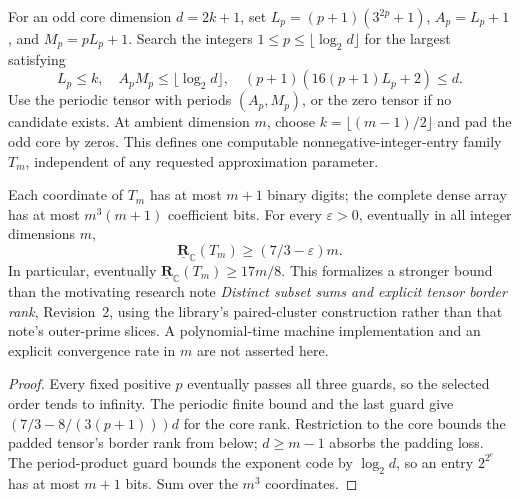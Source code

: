 \begin{definition}
  \label{def:frontiers-dissociated-uniform-tensor}
  \leanok
  For an odd core dimension $d=2k+1$, set $L_p=(p+1)(3^{2p}+1)$,
  $A_p=L_p+1$, and $M_p=pL_p+1$. Search the integers
  $1\le p\le\lfloor\log_2d\rfloor$ for the largest satisfying
  \[
    L_p\le k,\quad A_pM_p\le\lfloor\log_2d\rfloor,\quad
    (p+1)(16(p+1)L_p+2)\le d.
  \]
  Use the periodic tensor with periods $(A_p,M_p)$, or the zero tensor if
  no candidate exists. At ambient dimension $m$, choose
  $k=\lfloor(m-1)/2\rfloor$ and pad the odd core by zeros. This defines one
  computable nonnegative-integer-entry family $T_m$, independent of any
  requested approximation parameter.
\end{definition}

\begin{theorem}
  \label{thm:frontiers-dissociated-uniform-border-rank}
  \leanok
  Each coordinate of $T_m$ has at most $m+1$ binary digits; the complete dense
  array has at most $m^3(m+1)$ coefficient bits. For every $\varepsilon>0$,
  eventually in all integer dimensions $m$,
  \[
    \underline{\mathbf R}_{\mathbb C}(T_m)\ge(7/3-\varepsilon)m.
  \]
  In particular, eventually $\underline{\mathbf R}_{\mathbb C}(T_m)\ge17m/8$.
  This formalizes a stronger bound than the motivating research note
  \emph{Distinct subset sums and explicit tensor border rank}, Revision~2,
  using the library's paired-cluster construction rather than that note's
  outer-prime slices. A polynomial-time machine implementation and an explicit
  convergence rate in $m$ are not asserted here.
\end{theorem}
\begin{proof}
  \leanok
  Every fixed positive $p$ eventually passes all three guards, so the selected
  order tends to infinity. The periodic finite bound and the last guard give
  $(7/3-8/(3(p+1)))d$ for the core rank. Restriction to the core bounds the
  padded tensor's border rank from below; $d\ge m-1$ absorbs the padding loss.
  The period-product guard bounds the exponent code by $\log_2d$, so an entry
  $2^{2^e}$ has at most $m+1$ bits. Sum over the $m^3$ coordinates.
\end{proof}

